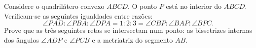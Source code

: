 Considere o quadrilátero convexo $ABCD$. O ponto $P$ está no interior do $ABCD$. Verificam-se as seguintes igualdades entre razões:
\[\angle PAD : \angle PBA : \angle DPA = 1 : 2 : 3 = \angle CBP : \angle BAP : \angle BPC.\]
Prove que as três seguintes retas se intersectam num ponto: as bissetrizes internas dos ângulos $\angle ADP$ e $\angle PCB$ e a metriatriz do segmento $AB$.
